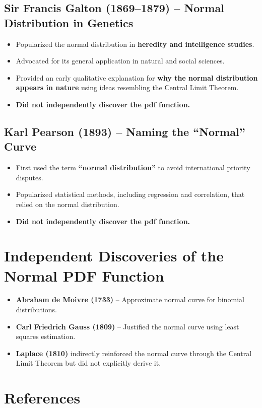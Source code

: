 \documentclass{article}
\begin{document}
\subsection{Sir Francis Galton (1869–1879) – Normal Distribution in Genetics}
\begin{itemize}
    \item Popularized the normal distribution in \textbf{heredity and intelligence studies}.
    \item Advocated for its general application in natural and social sciences.
    \item Provided an early qualitative explanation for \textbf{why the normal distribution appears in nature} using ideas resembling the Central Limit Theorem.
    \item \textbf{Did not independently discover the pdf function.}
\end{itemize}

\subsection{Karl Pearson (1893) – Naming the “Normal” Curve}
\begin{itemize}
    \item First used the term \textbf{“normal distribution”} to avoid international priority disputes.
    \item Popularized statistical methods, including regression and correlation, that relied on the normal distribution.
    \item \textbf{Did not independently discover the pdf function.}
\end{itemize}

\section{Independent Discoveries of the Normal PDF Function}
\begin{itemize}
    \item \textbf{Abraham de Moivre (1733)} – Approximate normal curve for binomial distributions.
    \item \textbf{Carl Friedrich Gauss (1809)} – Justified the normal curve using least squares estimation.
    \item \textbf{Laplace (1810)} indirectly reinforced the normal curve through the Central Limit Theorem but did not explicitly derive it.
\end{itemize}

\section{References}
\end{document}
